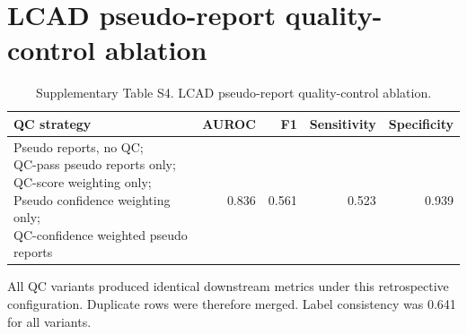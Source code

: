 \documentclass[11pt,a4paper]{article}
\begin{document}
\section*{LCAD pseudo-report quality-control ablation}
\begin{table}[!htbp]
  \centering
  \caption{Supplementary Table S4. LCAD pseudo-report quality-control ablation.}
  \label{tab:s4_lcad_qc_ablation}
  \small
  \begin{threeparttable}
  \begin{tabular}{lrrrr}
    \toprule
    \textbf{QC strategy} & \textbf{AUROC} & \textbf{F1} & \textbf{Sensitivity} & \textbf{Specificity} \\
    \midrule
    \makecell[l]{Pseudo reports, no QC;\\QC-pass pseudo reports only;\\QC-score weighting only;\\Pseudo confidence weighting only;\\QC-confidence weighted pseudo reports} & 0.836 & 0.561 & 0.523 & 0.939 \\
    \bottomrule
  \end{tabular}
  \begin{tablenotes}[flushleft]
    \footnotesize
    \item All QC variants produced identical downstream metrics under this retrospective configuration. Duplicate rows were therefore merged. Label consistency was 0.641 for all variants.
  \end{tablenotes}
  \end{threeparttable}
\end{table}
\end{document}
